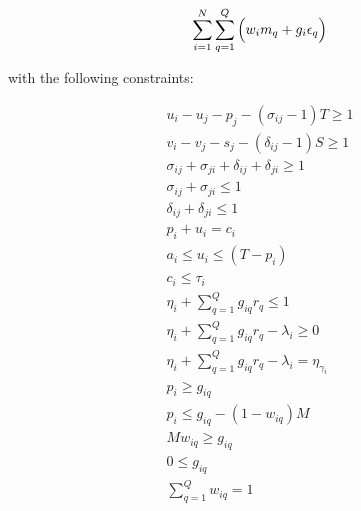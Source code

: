 \documentclass[letterpaper, 10pt, conference]{IEEEtran}
\begin{document}
\begin{equation}\label{eq:objective}
    \sum_{i=1}^N \sum_{q=1}^Q \Big( w_i m_q + g_i \epsilon_q \Big) \\
\end{equation}

with the following constraints:

\begin{subequations}
\begin{align}
    u_i - u_j - p_j - (\sigma_{ij} - 1)T \geq 1                     \label{subeq:time}         \\
    v_i - v_j - s_j - (\delta_{ij} - 1)S \geq 1                     \label{subeq:space}        \\
    \sigma_{ij} + \sigma_{ji} + \delta_{ij} + \delta_{ji} \geq 1    \label{subeq:valid_pos}    \\
    \sigma_{ij} + \sigma_{ji} \leq 1                                \label{subeq:sigma}        \\
    \delta_{ij} + \delta_{ji} \leq 1                                \label{subeq:delta}        \\
    p_i + u_i = c_i                                                 \label{subeq:detach}       \\
    a_i \leq u_i \leq (T - p_i)                                     \label{subeq:valid_starts} \\
    c_i \leq \tau_i                                                 \label{subeq:valid_depart} \\
    \eta_i + \sum_{q=1}^Q g_{iq} r_q \leq 1                         \label{subeq:max_charge}   \\
    \eta_i + \sum_{q=1}^Q g_{iq} r_q - \lambda_i \geq 0             \label{subeq:min_charge}   \\
    \eta_i + \sum_{q=1}^Q g_{iq} r_q - \lambda_i = \eta_{\gamma_i}  \label{subeq:next_charge}  \\
    p_i \geq g_{iq}                                                 \label{subeq:gpgret}       \\
    p_i \leq g_{iq} - (1 - w_{iq})M                                 \label{subeq:gpsmol}       \\
    Mw_{iq} \geq g_{iq}                                             \label{subeq:gwgret}       \\
    0 \leq g_{iq}                                                   \label{subeq:gwsmol}       \\
    \sum_{q=1}^Q w_{iq} = 1                                         \label{subeq:wmax}
\end{align}
\end{subequations}
\end{document}
